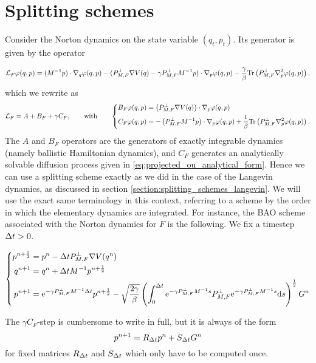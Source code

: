 \section{Splitting schemes}
Consider the Norton dynamics on the state variable $(q_t,p_t)$. Its generator is given by the operator

\begin{equation}
    \label{eq:norton_generator}
    \mathcal{L}_F\varphi(q,p)=(M^{-1}p)\cdot \nabla_q\varphi(q,p)-(P_{M,F}^\perp\nabla V(q)-\gamma P_{M,F}^\perp M^{-1}p)\cdot\nabla_p\varphi(q,p)-\frac{\gamma}\beta\mathrm{Tr}\left(P_{M,F}^\perp\nabla_p^2\varphi(q,p)\right),
\end{equation}
which we rewrite as 
\begin{equation}
    \label{eq:norton_generator_splitting}
    \mathcal{L}_F=A+B_F+\gamma C_F,\qquad \text{with} \qquad
    \left\{\begin{aligned}
        B_F\varphi(q,p)&=\left(P_{M,F}^\perp\nabla V(q)\right)\cdot \nabla_p\varphi(q,p)\\
        C_F\varphi(q,p)&=-\left(P_{M,F}^\perp M^{-1}p\right)\cdot\nabla_p\varphi(q,p)+\frac1\beta\mathrm{Tr}\left(P_{M,F}^\perp\nabla_p^2\varphi(q,p)\right).
    \end{aligned}\right.
\end{equation}
The $A$ and $B_F$ operators are the generators of exactly integrable dynamics (namely ballistic Hamiltonian dynamics), and $C_F$ generates an analytically solvable diffusion process given in \eqref{eq:projected_ou_analytical_form}. Hence we can use a splitting scheme exactly as we did in the case of the Langevin dynamics, as discussed in section \ref{section:splitting_schemes_langevin}. 
We will use the exact same terminology in this context, referring to a scheme by the order in which the elementary dynamics are integrated.
For instance, the BAO scheme associated with the Norton dynamics for $F$ is the following. We fix a timestep ${\Delta t}>0$.

\begin{example}
    \begin{equation}
        \left\{
            \begin{aligned}
                p^{n+\frac12}&=p^n-{\Delta t} P_{M,F}^\perp \nabla V(q^n)\\
                q^{n+1}&=q^n+{\Delta t} M^{-1}p^{n+\frac12}\\
                p^{n+1}&=\mathrm{e}^{-\gamma P_{M,F}^\perp M^{-1}{\Delta t}}p^{n+\frac12}-\sqrt{\frac{2\gamma}{\beta}}\left(\int_0^{\Delta t}\mathrm{e}^{-\gamma P_{M,F}^\perp M^{-1}s}P_{M,F}^\perp\mathrm{e}^{-\gamma P_{M,F}^\perp M^{-1}s} \mathrm{d} s\right)^{\frac12}G^n
            \end{aligned}\right.
    \end{equation}
\end{example}
The $\gamma C_F$-step is cumbersome to write in full, but it is always of the form 
\[p^{n+1}=R_{\Delta t} p^n + S_{\Delta t} G^n\]
for fixed matrices $R_{\Delta t}$ and $S_{\Delta t}$ which only have to be computed once.

